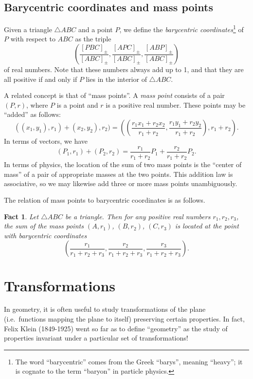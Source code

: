 \documentclass[12pt]{book}
\numberwithin{exc}{section}
\numberwithin{figure}{section}
\newtheorem{fact}[theorem]{Fact}
\numberwithin{equation}{theorem}
\begin{document}
\section{Barycentric coordinates and mass points}

Given a triangle $\triangle ABC$ and a point $P$, we define the
\emph{barycentric coordinates}\footnote{The word ``barycentric'' comes from the Greek ``barys'', meaning ``heavy''; it is cognate to the term ``baryon'' in particle physics.}   of 
$P$ with respect to $ABC$ as the triple
\[
\left( \frac{[PBC]_{\pm}}{[ABC]_{\pm}},
\frac{[APC]_{\pm}}{[ABC]_{\pm}},
\frac{[ABP]_{\pm}}{[ABC]_{\pm}} \right)
\]
of real numbers. Note that these numbers always add up to 1, 
and that they are all positive if and only if $P$ lies in the interior of
$\triangle ABC$.

A related concept is that of ``mass points''. A \emph{mass point}
 consists of a pair $(P,r)$, where $P$ is a point and $r$ is a positive real number. These points may be ``added'' 
 as follows:
\[
((x_1,y_1), r_1) + (x_2,y_2),r_2) =
\left(\left( \frac{r_1x_1 + r_2x_2}{r_1+r_2}, \frac{r_1y_1 + r_2y_2}{r_1+r_2}
\right), r_1+r_2 \right).
\]
In terms of vectors, we have
\[
(P_1,r_1) + (P_2,r_2) =
\frac{r_1}{r_1+r_2}P_1 +  \frac{r_2}{r_1+r_2}P_2.
\]
In terms of physics, the location of the sum of two mass points is the ``center of mass'' of a pair of appropriate masses at the two points. This addition law is associative, so we may likewise add three or more mass points unambiguously.

The relation of mass points to barycentric coordinates is as follows.
\begin{fact}
Let $\triangle ABC$ be a triangle. Then for any positive real numbers
$r_1, r_2, r_3$, the sum of the mass points $(A,r_1)$, $(B, r_2)$, $(C, r_3)$ is located at the point with barycentric coordinates
\[
\left( \frac{r_1}{r_1 + r_2 + r_3}, \frac{r_2}{r_1 + r_2 + r_3}, \frac{r_3}{r_1 + r_2 + r_3} \right).
\]
\end{fact}

\chapter{Transformations}
\label{chap:transform}

In geometry, it is often useful to study transformations of the 
plane (i.e.\ functions mapping the plane to itself) preserving certain 
properties. In fact, Felix Klein (1849-1925) went so far as to define 
``geometry'' as the study of properties invariant under a particular set 
of transformations!
\end{document}
